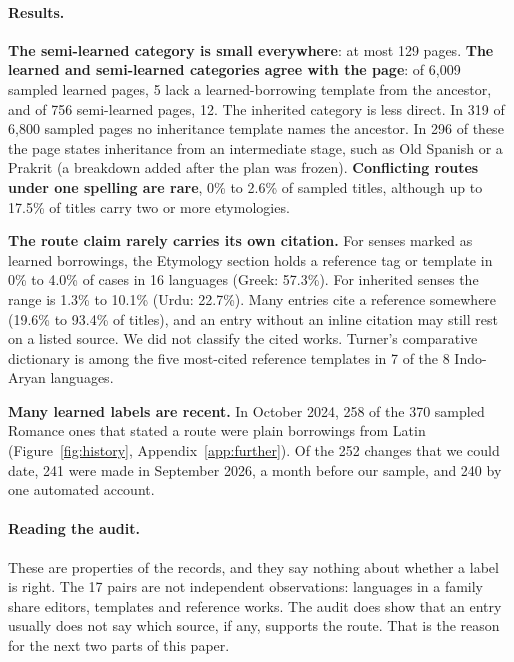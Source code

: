 \documentclass[11pt]{article}
\begin{document}
\paragraph{Results.} \textbf{The semi-learned category is small everywhere}: at most 129 pages. \textbf{The learned and semi-learned categories agree with the page}: of 6,009 sampled learned pages, 5 lack a learned-borrowing template from the ancestor, and of 756 semi-learned pages, 12. The inherited category is less direct. In 319 of 6,800 sampled pages no inheritance template names the ancestor. In 296 of these the page states inheritance from an intermediate stage, such as Old Spanish or a Prakrit (a breakdown added after the plan was frozen). \textbf{Conflicting routes under one spelling are rare}, 0\% to 2.6\% of sampled titles, although up to 17.5\% of titles carry two or more etymologies.

\textbf{The route claim rarely carries its own citation.} For senses marked as learned borrowings, the Etymology section holds a reference tag or template in 0\% to 4.0\% of cases in 16 languages (Greek: 57.3\%). For inherited senses the range is 1.3\% to 10.1\% (Urdu: 22.7\%). Many entries cite a reference somewhere (19.6\% to 93.4\% of titles), and an entry without an inline citation may still rest on a listed source. We did not classify the cited works. Turner's comparative dictionary is among the five most-cited reference templates in 7 of the 8 Indo-Aryan languages.

\textbf{Many learned labels are recent.} In October 2024, 258 of the 370 sampled Romance ones that stated a route were plain borrowings from Latin (Figure~\ref{fig:history}, Appendix~\ref{app:further}). Of the 252 changes that we could date, 241 were made in September 2026, a month before our sample, and 240 by one automated account.

\paragraph{Reading the audit.} These are properties of the records, and they say nothing about whether a label is right. The 17 pairs are not independent observations: languages in a family share editors, templates and reference works. The audit does show that an entry usually does not say which source, if any, supports the route. That is the reason for the next two parts of this paper.
\end{document}
